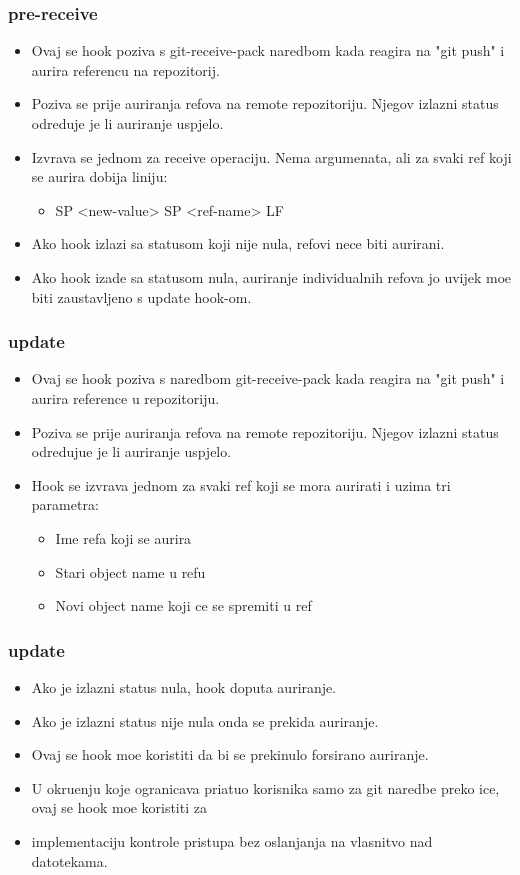 \documentclass{beamer}
\begin{document}
\begin{frame}
\frametitle{pre-receive}
\begin{itemize}
    \item Ovaj se hook poziva s git-receive-pack naredbom kada reagira na "git push" i aurira referencu na repozitorij.
    \item Poziva se prije auriranja refova na remote repozitoriju. Njegov izlazni status odreduje je li auriranje uspjelo.
    \item Izvrava se jednom za receive operaciju. Nema argumenata, ali za svaki ref koji se aurira dobija liniju:
    \begin{itemize}
        \item <old-value> SP <new-value> SP <ref-name> LF
    \end{itemize}
    \item Ako hook izlazi sa statusom koji nije nula, refovi nece biti aurirani.
    \item Ako hook izade sa statusom nula, auriranje individualnih refova jo uvijek moe biti zaustavljeno s update hook-om.
\end{itemize}
\end{frame}

\begin{frame}
\frametitle{update}
\begin{itemize}
    \item Ovaj se hook poziva s naredbom git-receive-pack kada reagira na "git push" i aurira reference u repozitoriju.
    \item Poziva se prije auriranja refova na remote repozitoriju. Njegov izlazni status odredujue je li auriranje uspjelo.
    \item Hook se izvrava jednom za svaki ref koji se mora aurirati i uzima tri parametra:
    \begin{itemize}
        \item Ime refa koji se aurira
        \item Stari object name u refu
        \item Novi object name koji ce se spremiti u ref
    \end{itemize}
\end{itemize}
\end{frame}   
\begin{frame}
\frametitle{update}
\begin{itemize}
    \item Ako je izlazni status nula, hook doputa auriranje.
    \item Ako je izlazni status nije nula onda se prekida auriranje.
    \item Ovaj se hook moe koristiti da bi se prekinulo forsirano auriranje.
    \item U okruenju koje ogranicava priatuo korisnika samo za git naredbe preko ice, ovaj se hook moe koristiti za 
    \item implementaciju kontrole pristupa bez oslanjanja na vlasnitvo nad datotekama.
\end{itemize}
\end{frame}
\end{document}
